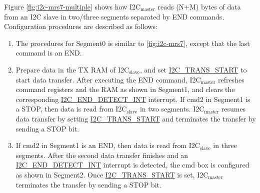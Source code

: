 \documentclass[main\_\_EN.tex]{subfiles}
\begin{document}
Figure \ref{fig:i2c-mrs7-multiple}  shows how I2C$_\text{master}$ reads (N+M) bytes of data from an I2C slave in two/three segments separated by END commands. Configuration procedures are described as follows:
\begin{enumerate}
    \item The procedures for Segment0 is similar to \ref{fig:i2c-mrs7}, except that the last command is an END.
    \item Prepare data in the TX RAM of I2C$_\text{slave}$, and set \hyperref[fielddesc:I2CTRANSSTART]{I2C\_TRANS\_START} to start data transfer. After executing the END command, I2C$_\text{master}$ refreshes command registers and the RAM as shown in Segment1, and clears the corresponding \hyperref[int:i2c-end]{I2C\_END\_DETECT\_INT} interrupt. If cmd2 in Segment1 is a STOP, then data is read from I2C$_\text{slave}$ in two segments. I2C$_\text{master}$ resumes data transfer by setting \hyperref[fielddesc:I2CTRANSSTART]{I2C\_TRANS\_START} and terminates the transfer by sending a STOP bit.
    \item If cmd2 in Segment1 is an END, then data is read from I2C$_\text{slave}$ in three segments. After the second data transfer finishes and an \hyperref[int:i2c-end]{I2C\_END\_DETECT\_INT} interrupt is detected, the cmd box is configured as shown in Segment2. Once \hyperref[fielddesc:I2CTRANSSTART]{I2C\_TRANS\_START} is set, I2C$_\text{master}$ terminates the transfer by sending a STOP bit.

\end{enumerate}
\end{document}

